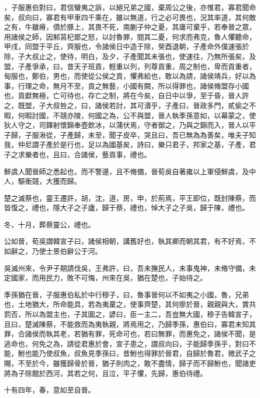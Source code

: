 \begin{pinyinscope}
，子服惠伯對曰，君信蠻夷之訴，以絕兄弟之國，棄周公之後，亦惟君，寡君聞命矣，叔向曰，寡君有甲車四千乘在，雖以無道，行之必可畏也，況其率道，其何敵之有，牛雖瘠，僨於豚上，其畏不死，南蒯子仲之憂，其庸可棄乎，若奉晉之眾，用諸侯之師，因邾莒杞鄫之怒，以討魯罪，間其二憂，何求而弗克，魯人懼聽命，甲戌，同盟于平丘，齊服也，令諸侯日中造于除，癸酉退朝，子產命外僕速張於除，子大叔止之，使待，明白，及夕，子產聞其未張也，使速往，乃無所張矣，及盟，子產爭承，曰，昔天子班貢，輕重以列，列尊貢重，周之制也，卑而貢重者，甸服也，鄭伯，男也，而使從公侯之貢，懼弗給也，敢以為請，諸侯靖兵，好以為事，行理之命，無月不至，貢之無藝，小國有闕，所以得罪也，諸侯脩盟存小國也，貢獻無極，亡可待也，存亡之制，將在今矣，自日中以爭，至于昏，晉人許之，既盟，子大叔咎之，曰，諸侯若討，其可瀆乎，子產曰，晉政多門，貳偷之不暇，何暇討國，不競亦陵，何國之為，公不與盟，晉人執季孫意如，以幕蒙之，使狄人守之，司鐸射懷錦奉壺飲冰，以蒲伏焉，守者御之，乃與之錦而入，晉人以平子歸，子服湫從，子產歸，未至，聞子皮卒，哭且曰，吾已無為為善矣，唯夫子知我，仲尼謂子產於是行也，足以為國基矣，詩曰，樂只君子，邦家之基，子產，君子之求樂者也，且曰，合諸侯，藝貢事，禮也。

鮮虞人聞晉師之悉起也，而不警邊，且不脩備，晉荀吳自著雍以上軍侵鮮虞，及中人，驅衝競，大獲而歸。

楚之滅蔡也，靈王遷許，胡，沈，道，房，申，於荊焉，平王即位，既封陳蔡，而皆復之，禮也，隱大子之子廬，歸于蔡，禮也，悼大子之子吳，歸于陳，禮也。

冬，十月，葬蔡靈公，禮也。

公如晉，荀吳謂韓宣子曰，諸侯相朝，講舊好也，執其卿而朝其君，有不好焉，不如辭之，乃使士景伯辭公于河。

吳滅州來，令尹子期請伐吳，王弗許，曰，吾未撫民人，未事鬼神，未脩守備，未定國家，而用民力，敗不可悔，州來在吳，猶在楚也，子始待之。

季孫猶在晉，子服惠伯私於中行穆子，曰，魯事晉何以不如夷之小國，魯，兄弟也，土地猶大，所命能具，若為夷棄之，使事齊楚，其何瘳於晉，親親與大，賞共罰否，所以為盟主也，子其圖之，諺曰，臣一主二，吾豈無大國，穆子告韓宣子，且曰，楚滅陳蔡，不能救而為夷執親，將焉用之，乃歸季孫，惠伯曰，寡君未知其罪，合諸侯而執其老，若猶有罪，死命可也，若曰無罪，而惠免之，諸侯不聞，是逃命也，何免之為，請從君惠於會，宣子患之，謂叔向曰，子能歸季孫乎，對曰不能，鮒也能乃使叔魚，叔魚見季孫曰，昔鮒也得罪於晉君，自歸於魯君，微武子之賜，不至於今，雖獲歸骨於晉，猶子則肉之，敢不盡情，歸子而不歸鮒也，聞諸吏將為子除館於西河，其若之何，且泣，平子懼，先歸，惠伯待禮。

十有四年，春，意如至自晉。


\end{pinyinscope}
